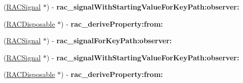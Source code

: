 \begin{DoxyCompactItemize}
(\mbox{\hyperlink{interface_r_a_c_signal}{R\+A\+C\+Signal}} $\ast$) -\/ {\bfseries rac\+\_\+signal\+With\+Starting\+Value\+For\+Key\+Path\+:observer\+:}
\item 
\mbox{\label{category_n_s_object_07_r_a_c_property_subscribing_deprecated_08_a141937c1184b0cc9235ea98780ab70b7}} 
(\mbox{\hyperlink{interface_r_a_c_disposable}{R\+A\+C\+Disposable}} $\ast$) -\/ {\bfseries rac\+\_\+derive\+Property\+:from\+:}
\item 
\mbox{\label{category_n_s_object_07_r_a_c_property_subscribing_deprecated_08_ab8afdc7b598a75e3d34cfe75c963991c}} 
(\mbox{\hyperlink{interface_r_a_c_signal}{R\+A\+C\+Signal}} $\ast$) -\/ {\bfseries rac\+\_\+signal\+For\+Key\+Path\+:observer\+:}
\item 
\mbox{\label{category_n_s_object_07_r_a_c_property_subscribing_deprecated_08_ad28ba3e44343ff4df9cd418016c1722d}} 
(\mbox{\hyperlink{interface_r_a_c_signal}{R\+A\+C\+Signal}} $\ast$) -\/ {\bfseries rac\+\_\+signal\+With\+Starting\+Value\+For\+Key\+Path\+:observer\+:}
\item 
\mbox{\label{category_n_s_object_07_r_a_c_property_subscribing_deprecated_08_a141937c1184b0cc9235ea98780ab70b7}} 
(\mbox{\hyperlink{interface_r_a_c_disposable}{R\+A\+C\+Disposable}} $\ast$) -\/ {\bfseries rac\+\_\+derive\+Property\+:from\+:}
\end{DoxyCompactItemize}

